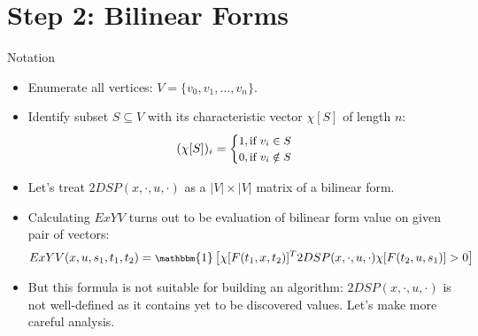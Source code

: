 \documentclass{beamer}
\begin{document}
\section{Step 2: Bilinear Forms}

\begin{frame}{Notation}
    \begin{itemize}
        \item Enumerate all vertices: $V = \{v_0, v_1, \ldots, v_n\}$.
        \item Identify subset $S \subseteq V$ with its characteristic vector $\chi[S]$ of length $n$: 
        \begin{equation}
            \small
            (\chi[S])_i = \begin{cases}
                1, \text{if}~v_i \in S \\
                0, \text{if}~v_i \notin S \\
            \end{cases}
        \end{equation}
        \item Let's treat $2DSP(x, \cdot, u, \cdot)$ as a $|V| \times |V|$ matrix of a bilinear form.
        \item Calculating $ExYV$ turns out to be evaluation of bilinear form value on given pair of vectors:
        \begin{equation}
            \footnotesize
            ExYV(x, u, s_1, t_1, t_2) = \mathbbm{1}\left[ \chi[F(t_1, x, t_2)]^T 2DSP(x, \cdot, u, \cdot) \chi[F(t_2, u, s_1)]  > 0 \right]
        \end{equation}
        \item But this formula is not suitable for building an algorithm: $2DSP(x, \cdot, u, \cdot)$ is not well-defined as it contains yet to be discovered values. Let's make more careful analysis.
    \end{itemize}
\end{frame}
\end{document}
